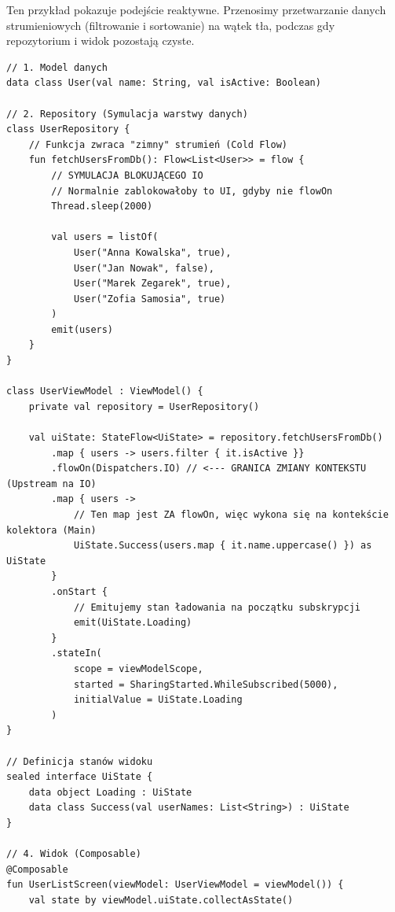 Ten przykład pokazuje podejście reaktywne. Przenosimy przetwarzanie danych strumieniowych (filtrowanie i sortowanie) na wątek tła, podczas gdy repozytorium i widok pozostają czyste.

\begin{verbatim}
// 1. Model danych
data class User(val name: String, val isActive: Boolean)

// 2. Repository (Symulacja warstwy danych)
class UserRepository {
    // Funkcja zwraca "zimny" strumień (Cold Flow)
    fun fetchUsersFromDb(): Flow<List<User>> = flow {
        // SYMULACJA BLOKUJĄCEGO IO
        // Normalnie zablokowałoby to UI, gdyby nie flowOn
        Thread.sleep(2000) 
        
        val users = listOf(
            User("Anna Kowalska", true),
            User("Jan Nowak", false),
            User("Marek Zegarek", true),
            User("Zofia Samosia", true)
        )
        emit(users)
    }
}

class UserViewModel : ViewModel() {
    private val repository = UserRepository()

    val uiState: StateFlow<UiState> = repository.fetchUsersFromDb()
        .map { users -> users.filter { it.isActive }}
        .flowOn(Dispatchers.IO) // <--- GRANICA ZMIANY KONTEKSTU (Upstream na IO)
        .map { users ->
            // Ten map jest ZA flowOn, więc wykona się na kontekście kolektora (Main)
            UiState.Success(users.map { it.name.uppercase() }) as UiState
        }
        .onStart {
            // Emitujemy stan ładowania na początku subskrypcji
            emit(UiState.Loading)
        }
        .stateIn(
            scope = viewModelScope,
            started = SharingStarted.WhileSubscribed(5000),
            initialValue = UiState.Loading
        )
}

// Definicja stanów widoku
sealed interface UiState {
    data object Loading : UiState
    data class Success(val userNames: List<String>) : UiState
}

// 4. Widok (Composable)
@Composable
fun UserListScreen(viewModel: UserViewModel = viewModel()) {
    val state by viewModel.uiState.collectAsState()


\end{verbatim}
